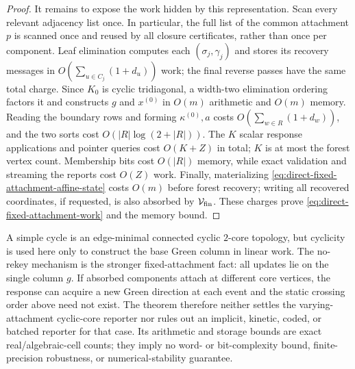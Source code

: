 \begin{proof}
It remains to expose the work hidden by this representation.  Scan every
relevant adjacency list once.  In particular, the full list of the common
attachment $p$ is scanned once and reused by all closure certificates, rather
than once per component.  Leaf elimination computes each
$(\sigma_j,\gamma_j)$ and stores its recovery messages in
$O(\sum_{u\in C_j}(1+d_u))$ work; the final reverse passes have the same
total charge.  Since $K_0$ is cyclic tridiagonal, a width-two elimination
ordering factors it and constructs $g$ and $x^{(0)}$ in $O(m)$ arithmetic
and $O(m)$ memory.  Reading the boundary rows and forming
$\kappa^{(0)},a$ costs
$O(\sum_{w\in R}(1+d_w))$, and the two sorts cost
$O(|R|\log(2+|R|))$.  The $K$ scalar response applications and pointer queries
cost $O(K+Z)$ in total; $K$ is at most the forest vertex count.  Membership
bits cost $O(|R|)$ memory, while exact validation and streaming the reports
cost $O(Z)$ work.  Finally, materializing
\cref{eq:direct-fixed-attachment-affine-state} costs $O(m)$ before forest
recovery; writing all recovered coordinates, if requested, is also absorbed
by $\mathcal V_{\rm fin}$.  These charges prove
\cref{eq:direct-fixed-attachment-work} and the memory bound.
\end{proof}

\begin{remark}
\label{rem:direct-fixed-attachment-scope}
A simple cycle is an edge-minimal connected cyclic $2$-core topology, but
cyclicity is used here only to construct the base Green column in linear work.
The no-rekey mechanism is the stronger fixed-attachment fact: all updates lie
on the single column $g$.  If absorbed components attach at
different core vertices, the response can acquire a new Green direction at
each event and the static crossing order above need not exist.  The theorem
therefore neither settles the varying-attachment cyclic-core reporter nor
rules out an implicit, kinetic, coded, or batched reporter for that case.  Its
arithmetic and storage bounds are exact real/algebraic-cell counts; they imply
no word- or bit-complexity bound, finite-precision robustness, or
numerical-stability guarantee.
\end{remark}

